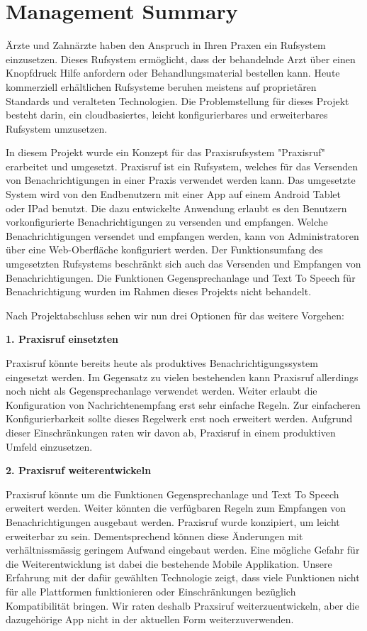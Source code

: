 \section*{Management Summary}

Ärzte und Zahnärzte haben den Anspruch in Ihren Praxen ein Rufsystem einzusetzen.
Dieses Rufsystem ermöglicht, dass der behandelnde Arzt über einen Knopfdruck Hilfe anfordern oder Behandlungsmaterial bestellen kann.
Heute kommerziell erhältlichen Rufsysteme beruhen meistens auf proprietären Standards und veralteten Technologien. \cite{aufgabenstellung}
Die Problemstellung für dieses Projekt besteht darin, ein cloudbasiertes, leicht konfigurierbares und erweiterbares Rufsystem umzusetzen.

In diesem Projekt wurde ein Konzept für das Praxisrufsystem "Praxisruf" erarbeitet und umgesetzt.
Praxisruf ist ein Rufsystem, welches für das Versenden von Benachrichtigungen in einer Praxis verwendet werden kann.
Das umgesetzte System wird von den Endbenutzern mit einer App auf einem Android Tablet oder IPad benutzt.
Die dazu entwickelte Anwendung erlaubt es den Benutzern vorkonfigurierte Benachrichtigungen zu versenden und empfangen.
Welche Benachrichtigungen versendet und empfangen werden, kann von Administratoren über eine Web-Oberfläche konfiguriert werden.
Der Funktionsumfang des umgesetzten Rufsystems beschränkt sich auch das Versenden und Empfangen von Benachrichtigungen.
Die Funktionen Gegensprechanlage und Text To Speech für Benachrichtigung wurden im Rahmen dieses Projekts nicht behandelt.

Nach Projektabschluss sehen wir nun drei Optionen für das weitere Vorgehen:


\textbf{1. Praxisruf einsetzten}

Praxisruf könnte bereits heute als produktives Benachrichtigungssystem eingesetzt werden.
Im Gegensatz zu vielen bestehenden kann Praxisruf allerdings noch nicht als Gegensprechanlage verwendet werden.
Weiter erlaubt die Konfiguration von Nachrichtenempfang erst sehr einfache Regeln.
Zur einfacheren Konfigurierbarkeit sollte dieses Regelwerk erst noch erweitert werden.
Aufgrund dieser Einschränkungen raten wir davon ab, Praxisruf in einem produktiven Umfeld einzusetzen.

\textbf{2. Praxisruf weiterentwickeln}

Praxisruf könnte um die Funktionen Gegensprechanlage und Text To Speech erweitert werden.
Weiter könnten die verfügbaren Regeln zum Empfangen von Benachrichtigungen ausgebaut werden.
Praxisruf wurde konzipiert, um leicht erweiterbar zu sein.
Dementsprechend können diese Änderungen mit verhältnissmässig geringem Aufwand eingebaut werden.
Eine mögliche Gefahr für die Weiterentwicklung ist dabei die bestehende Mobile Applikation.
Unsere Erfahrung mit der dafür gewählten Technologie zeigt, dass viele Funktionen nicht für alle Plattformen funktionieren
oder Einschränkungen bezüglich Kompatibilität bringen.
Wir raten deshalb Praxsiruf weiterzuentwickeln, aber die dazugehörige App nicht in der aktuellen Form weiterzuverwenden.

